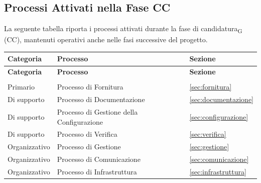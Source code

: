 
\subsection{Processi Attivati nella Fase CC}

La seguente tabella riporta i processi attivati durante la fase di
candidatura\textsubscript{G} (CC), mantenuti operativi anche nelle fasi successive
del progetto.

\bigskip

\begin{xltabular}{\textwidth}{
    >{\raggedright\arraybackslash}p{3cm}
    >{\raggedright\arraybackslash}X
    >{\raggedright\arraybackslash}p{3cm}
}
    \toprule
    \textbf{Categoria} & \textbf{Processo} & \textbf{Sezione} \\
    \midrule
    \endfirsthead

    \toprule
    \textbf{Categoria} & \textbf{Processo} & \textbf{Sezione} \\
    \midrule
    \endhead

    \midrule
     \\
    \endfoot

    \bottomrule
    \endlastfoot

    Primario
    & Processo di Fornitura
    & \ref{sec:fornitura} \\

    Di supporto
    & Processo di Documentazione
    & \ref{sec:documentazione} \\

    Di supporto
    & Processo di Gestione della Configurazione
    & \ref{sec:configurazione} \\

    Di supporto
    & Processo di Verifica
    & \ref{sec:verifica} \\

    Organizzativo
    & Processo di Gestione
    & \ref{sec:gestione} \\

    Organizzativo
    & Processo di Comunicazione
    & \ref{sec:comunicazione} \\

    Organizzativo
    & Processo di Infrastruttura
    & \ref{sec:infrastruttura} \\

\end{xltabular}

